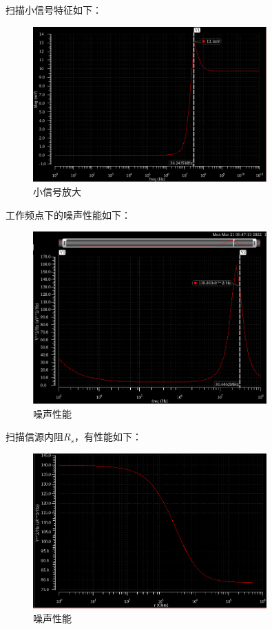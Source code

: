 \documentclass[12pt, a4paper]{article}
\begin{document}
    扫描小信号特征如下：
    \begin{figure}[H]
    	\centering
    	\includegraphics[width = 0.8\textwidth]{CS-noise-AC}
    	\caption{小信号放大}
    \end{figure}\par
    工作频点下的噪声性能如下：
    \begin{figure}[H]
    	\centering
    	\includegraphics[width = 0.8\textwidth]{CS-noise-noise}
    	\caption{噪声性能}
    \end{figure}\par
    扫描信源内阻$R_s$，有性能如下：
    \begin{figure}[H]
    	\centering
    	\includegraphics[width = 0.8\textwidth]{CS-noise-Rs}
    	\caption{噪声性能}
    \end{figure}\par
\end{document}
